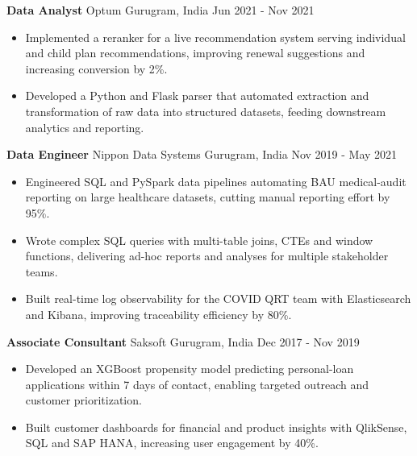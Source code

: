 \documentclass[10pt,a4paper]{article}
\newcommand{\role}[4]{\textbf{#1} \textbar{} #2 \hfill #3 \textbar{} #4\par}
\begin{document}
\vspace{3pt}
\role{Data Analyst}{Optum}{Gurugram, India}{Jun 2021 - Nov 2021}
\begin{itemize}
  \item Implemented a reranker for a live recommendation system serving individual and child plan recommendations, improving renewal suggestions and increasing conversion by 2\%.
  \item Developed a Python and Flask parser that automated extraction and transformation of raw data into structured datasets, feeding downstream analytics and reporting.
\end{itemize}
\vspace{3pt}
\role{Data Engineer}{Nippon Data Systems}{Gurugram, India}{Nov 2019 - May 2021}
\begin{itemize}
  \item Engineered SQL and PySpark data pipelines automating BAU medical-audit reporting on large healthcare datasets, cutting manual reporting effort by 95\%.
  \item Wrote complex SQL queries with multi-table joins, CTEs and window functions, delivering ad-hoc reports and analyses for multiple stakeholder teams.
  \item Built real-time log observability for the COVID QRT team with Elasticsearch and Kibana, improving traceability efficiency by 80\%.
\end{itemize}
\vspace{3pt}
\role{Associate Consultant}{Saksoft}{Gurugram, India}{Dec 2017 - Nov 2019}
\begin{itemize}
  \item Developed an XGBoost propensity model predicting personal-loan applications within 7 days of contact, enabling targeted outreach and customer prioritization.
  \item Built customer dashboards for financial and product insights with QlikSense, SQL and SAP HANA, increasing user engagement by 40\%.
\end{itemize}
\end{document}
